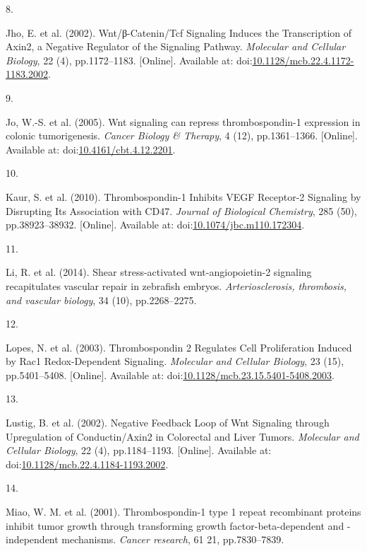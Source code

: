 \documentclass[
  11pt,
]{article}
\newlength{\cslhangindent}
\newlength{\csllabelwidth}
\newlength{\cslentryspacingunit} %
\newenvironment{CSLReferences}[2] %
 {%
  \setlength{\parindent}{0pt}
  \ifodd #1
  \let\oldpar\par
  \def\par{\hangindent=\cslhangindent\oldpar}
  \fi
  \setlength{\parskip}{#2\cslentryspacingunit}
 }%
 {}
\newcommand{\CSLLeftMargin}[1]{\parbox[t]{\csllabelwidth}{#1}}
\newcommand{\CSLRightInline}[1]{\parbox[t]{\linewidth - \csllabelwidth}{#1}\break}
\begin{document}
\begin{CSLReferences}{0}{0}
\leavevmode{}%
\CSLLeftMargin{8. }
\CSLRightInline{Jho, E. {et al.} (2002). {Wnt/β-Catenin/Tcf Signaling Induces the Transcription of Axin2, a Negative Regulator of the Signaling Pathway}. \emph{Molecular and Cellular Biology}, 22 (4), pp.1172--1183. {[}Online{]}. Available at: doi:\href{https://doi.org/10.1128/mcb.22.4.1172-1183.2002}{10.1128/mcb.22.4.1172-1183.2002}.}

\leavevmode{}%
\CSLLeftMargin{9. }
\CSLRightInline{Jo, W.-S. {et al.} (2005). {Wnt signaling can repress thrombospondin-1 expression in colonic tumorigenesis}. \emph{Cancer Biology \& Therapy}, 4 (12), pp.1361--1366. {[}Online{]}. Available at: doi:\href{https://doi.org/10.4161/cbt.4.12.2201}{10.4161/cbt.4.12.2201}.}

\leavevmode{}%
\CSLLeftMargin{10. }
\CSLRightInline{Kaur, S. {et al.} (2010). {Thrombospondin-1 Inhibits VEGF Receptor-2 Signaling by Disrupting Its Association with CD47}. \emph{Journal of Biological Chemistry}, 285 (50), pp.38923--38932. {[}Online{]}. Available at: doi:\href{https://doi.org/10.1074/jbc.m110.172304}{10.1074/jbc.m110.172304}.}

\leavevmode{}%
\CSLLeftMargin{11. }
\CSLRightInline{Li, R. {et al.} (2014). {Shear stress-activated wnt-angiopoietin-2 signaling recapitulates vascular repair in zebrafish embryos}. \emph{Arteriosclerosis, thrombosis, and vascular biology}, 34 (10), pp.2268--2275.}

\leavevmode{}%
\CSLLeftMargin{12. }
\CSLRightInline{Lopes, N. {et al.} (2003). {Thrombospondin 2 Regulates Cell Proliferation Induced by Rac1 Redox-Dependent Signaling}. \emph{Molecular and Cellular Biology}, 23 (15), pp.5401--5408. {[}Online{]}. Available at: doi:\href{https://doi.org/10.1128/mcb.23.15.5401-5408.2003}{10.1128/mcb.23.15.5401-5408.2003}.}

\leavevmode{}%
\CSLLeftMargin{13. }
\CSLRightInline{Lustig, B. {et al.} (2002). {Negative Feedback Loop of Wnt Signaling through Upregulation of Conductin/Axin2 in Colorectal and Liver Tumors}. \emph{Molecular and Cellular Biology}, 22 (4), pp.1184--1193. {[}Online{]}. Available at: doi:\href{https://doi.org/10.1128/mcb.22.4.1184-1193.2002}{10.1128/mcb.22.4.1184-1193.2002}.}

\leavevmode{}%
\CSLLeftMargin{14. }
\CSLRightInline{Miao, W. M. {et al.} (2001). {Thrombospondin-1 type 1 repeat recombinant proteins inhibit tumor growth through transforming growth factor-beta-dependent and -independent mechanisms.} \emph{Cancer research}, 61 21, pp.7830--7839.}


\end{CSLReferences}
\end{document}
